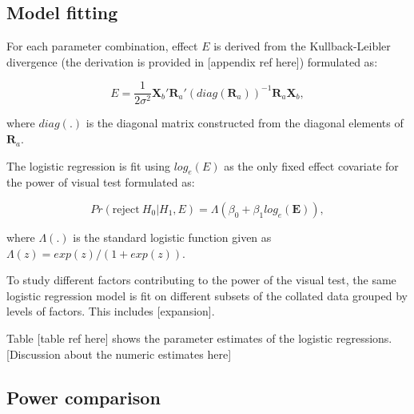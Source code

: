 \documentclass[]{interact}
\theoremstyle{plain}%
\theoremstyle{definition}
\theoremstyle{remark}
\begin{document}
\hypertarget{model-fitting}{%
\subsection{Model fitting}\label{model-fitting}}

For each parameter combination, effect \(E\) is derived from the
Kullback-Leibler divergence (the derivation is provided in {[}appendix
ref here{]}) formulated as:

\begin{equation} \label{eq:effect-size-ex1}
E = \frac{1}{2\sigma^2}\boldsymbol{X}_b'\boldsymbol{R}_a'(diag(\boldsymbol{R}_a))^{-1}\boldsymbol{R}_a\boldsymbol{X}_b,
\end{equation}

where \(diag(.)\) is the diagonal matrix constructed from the diagonal
elements of \(\boldsymbol{R}_a\).

The logistic regression is fit using \(log_e(E)\) as the only fixed
effect covariate for the power of visual test formulated as:

\begin{equation} \label{eq:logistic-regression-1-1}
Pr(\text{reject}~H_0|H_1,E) = \Lambda(\beta_0 + \beta_1 log_e(\boldsymbol{E})),
\end{equation}

where \(\Lambda(.)\) is the standard logistic function given as
\(\Lambda(z) = exp(z)/(1+exp(z))\).

To study different factors contributing to the power of the visual test,
the same logistic regression model is fit on different subsets of the
collated data grouped by levels of factors. This includes
{[}expansion{]}.

Table {[}table ref here{]} shows the parameter estimates of the logistic
regressions. {[}Discussion about the numeric estimates here{]}

\hypertarget{power-comparison}{%
\subsection{Power comparison}\label{power-comparison}}
\end{document}
